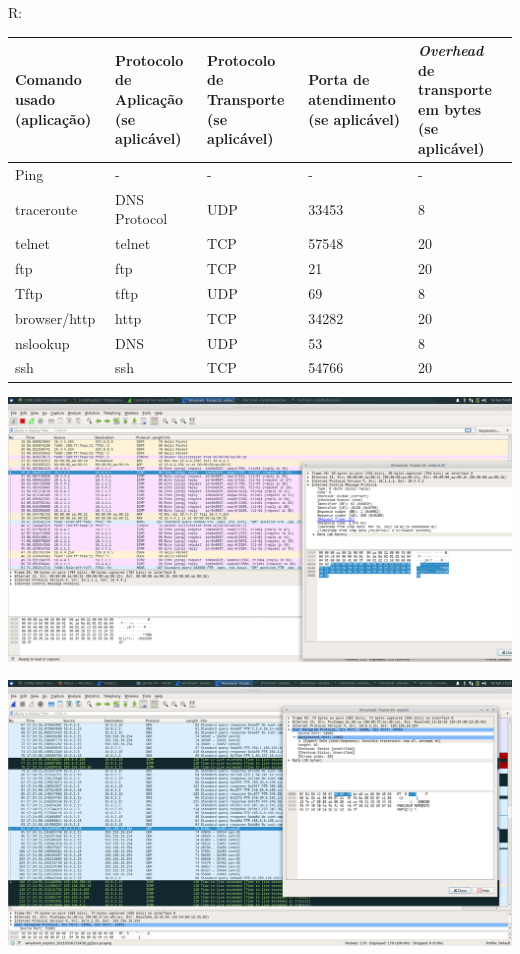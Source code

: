 \documentclass[a4paper]{article}
\begin{document}
R:
\begin{table}[h!] %
\begin{center}
\begin{tabular}{|m{7em}|m{7.5em}|m{7.5em}|m{7.5em}|m{7.5em}|}
\hline
Comando usado (aplicação)    &Protocolo de Aplicação (se aplicável) &Protocolo de Transporte (se aplicável) &Porta de atendimento (se aplicável) & \textit{Overhead} de transporte em bytes (se aplicável)\\
\hline
Ping&  -   &  -  &  -  &  -\\
\hline
traceroute & DNS Protocol   &  UDP  &  33453   &  8   \\
\hline
telnet& telnet & TCP & 57548& 20 \\
\hline
ftp& ftp & TCP & 21 & 20 \\
\hline
Tftp& tftp & UDP & 69 & 8  \\
\hline
browser/http& http & TCP & 34282& 20  \\
\hline
nslookup& DNS & UDP & 53 &  8\\
\hline
ssh& ssh & TCP & 54766 &  20\\
\hline

\end{tabular}
\end{center}
\end{table}


\begin{center}
	\includegraphics[scale=0.23]{images/ping}
\end{center}

\begin{center}
	\includegraphics[scale=0.23]{images/traceroute}

\end{center}
\end{document}
